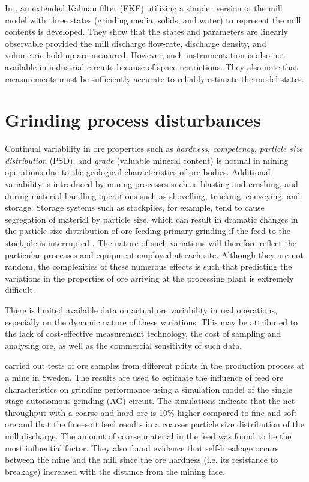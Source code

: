 In \cite{le_roux_ekf_2017}, an extended Kalman filter (EKF) utilizing a simpler version of the mill model with three states (grinding media, solids, and water) to represent the mill contents is developed. They show that the states and parameters are linearly observable provided the mill discharge flow-rate, discharge density, and volumetric hold-up are measured. However, such instrumentation is also not available in industrial circuits because of space restrictions. They also note that measurements must be sufficiently accurate to reliably estimate the model states.


\section*{Grinding process disturbances}

Continual variability in ore properties such as \textit{hardness}, \textit{competency}, \textit{particle size distribution} (PSD), and \textit{grade} (valuable mineral content) is normal in mining operations due to the geological characteristics of ore bodies. Additional variability is introduced by mining processes such as blasting and crushing, and during material handling operations such as shovelling, trucking, conveying, and storage. Storage systems such as stockpiles, for example, tend to cause segregation of material by particle size, which can result in dramatic changes in the particle size distribution of ore feeding primary grinding if the feed to the stockpile is interrupted \citep{estrada_hybrid_2014}. The nature of such variations will therefore reflect the particular processes and equipment employed at each site. Although they are not random, the complexities of these numerous effects is such that predicting the variations in the properties of ore arriving at the processing plant is extremely difficult.

There is limited available data on actual ore variability in real operations, especially on the dynamic nature of these variations. This may be attributed to the lack of cost-effective measurement technology, the cost of sampling and analysing ore, as well as the commercial sensitivity of such data.

\cite{hahne_ore_2003} carried out tests of ore samples from different points in the production process at a mine in Sweden. The results are used to estimate the influence of feed ore characteristics on grinding performance using a simulation model of the single stage autonomous grinding (AG) circuit. The simulations indicate that the net throughput with a coarse and hard ore is 10\% higher compared to fine and soft ore and that the fine–soft feed results in a coarser particle size distribution of the mill discharge. The amount of coarse material in the feed was found to be the most influential factor. They also found evidence that self-breakage occurs between the mine and the mill since the ore hardness (i.e. its resistance to breakage) increased with the distance from the mining face.

